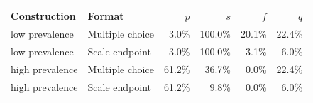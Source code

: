 \begin{tabular}{llrrrr}
\toprule
Construction & Format & $p$ & $s$ & $f$ & $q$ \\
\midrule
low prevalence & Multiple choice & 3.0\% & 100.0\% & 20.1\% & 22.4\% \\
low prevalence & Scale endpoint & 3.0\% & 100.0\% & 3.1\% & 6.0\% \\
high prevalence & Multiple choice & 61.2\% & 36.7\% & 0.0\% & 22.4\% \\
high prevalence & Scale endpoint & 61.2\% & 9.8\% & 0.0\% & 6.0\% \\
\bottomrule
\end{tabular}
